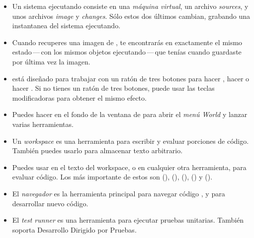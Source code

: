\documentclass[a4paper,10pt,twoside]{book}
\begin{document}
\begin{itemize}
  \item Un sistema \pharo ejecutando consiste en una \emph{m\'aquina virtual}, un archivo \emph{sources}, y unos archivos \emph{image} y \emph{changes}. S\'olo estos dos \'ultimos cambian, grabando una instantanea del sistema ejecutando.
  \item Cuando recuperes una imagen de \pharo, te encontrar\'as en exactamente el mismo estado\,---\,con los mismos objetos ejecutando\,---\,que ten\'ias cuando guardaste por \'ultima vez la imagen.
  \item \pharo est\'a dise\~nado para trabajar con un rat\'on de tres botones para hacer \click, hacer \actclick o hacer \metaclick. Si no tienes un rat\'on de tres botones, puede usar las teclas modificadoras para obtener el mismo efecto.
  \item Puedes hacer \click en el fondo de la ventana de \pharo para abrir el \emph{men\'u World} y lanzar varias herramientas.
  \item Un \emph{workspace} es una herramienta para escribir y evaluar porciones de c\'odigo. Tambi\'en puedes usarlo para almacenar texto arbitrario.
  \item Puedes usar  en el texto del workspace, o en cualquier otra herramienta, para evaluar c\'odigo. Los m\'as importante de estos son  (),  (),  (),  () y  ().
  \item El \emph{navegador} es la herramienta principal para navegar c\'odigo \pharo, y para desarrollar nuevo c\'odigo.
  \item El \emph{test runner} es una herramienta para ejecutar pruebas unitarias. Tambi\'en soporta Desarrollo Dirigido por Pruebas.
\end{itemize}

\ifx\wholebook\relax\else 
   
   
\end{document}
